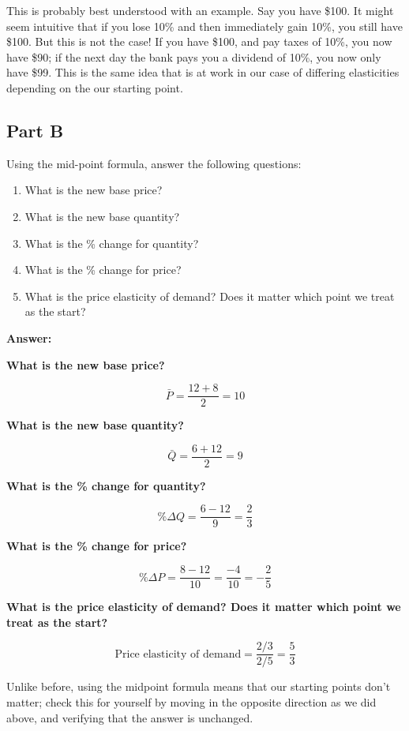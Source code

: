 \documentclass[12pt]{article}
\begin{document}
This is probably best understood with an example. Say you have \$100. It might seem intuitive that if you lose 10\% and then immediately gain 10\%, you still have \$100. But this is not the case! If you have \$100, and pay taxes of 10\%, you now have \$90; if the next day the bank pays you a dividend of 10\%, you now only have \$99. This is the same idea that is at work in our case of differing elasticities depending on the our starting point.

\subsection*{Part B}
Using the mid-point formula, answer the following questions:
\begin{enumerate}
    \item What is the new base price?
    \item What is the new base quantity?
    \item What is the \% change for quantity?
    \item What is the \% change for price?
    \item What is the price elasticity of demand? Does it matter which point we treat as the start?
\end{enumerate}

\textbf{Answer:}

\vspace{2mm}

\textbf{What is the new base price?}

\vspace{2mm}

$$\bar{P} = \dfrac{12 + 8}{2} = 10$$

\textbf{What is the new base quantity?}

$$\bar{Q} = \dfrac{6 + 12}{2} = 9$$

\textbf{What is the \% change for quantity?}

$$ \% \Delta Q = \dfrac{6-12}{9} = \dfrac{2}{3} $$

\textbf{What is the \% change for price?}

$$ \% \Delta P = \dfrac{8-12}{10} = \dfrac{-4}{10} = -\dfrac{2}{5}$$

\textbf{What is the price elasticity of demand? Does it matter which point we treat as the start?}

$$\text{Price elasticity of demand} = \dfrac{2/3}{2/5} = \dfrac{5}{3} $$

Unlike before, using the midpoint formula means that our starting points don't matter; check this for yourself by moving in the opposite direction as we did above, and verifying that the answer is unchanged.
\end{document}
